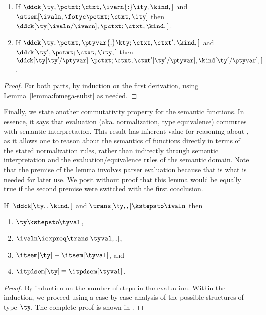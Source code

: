 \begin{lemma}
  \begin{enumerate}
  \item If $\ddck[\ty,{\pctxt;\ctxt,\ivarn{:}\ity},\kind,]$ and 
    $\stsem[\ivaln,{\fotyc \pctxt;\ctxt},\ity]$
    then $\ddck[\ty[\ivaln/\ivarn],\pctxt;\ctxt,\kind,]$.
  \item If $\ddck[\ty,{\pctxt,\ptyvar{:}\kty;\ctxt,\ctxt'},\kind,]$ and 
    $\ddck[\ty',\pctxt;\ctxt,\kty,]$
    then $\ddck[\ty[\ty'/\ptyvar],{\pctxt;\ctxt,\ctxt'[\ty'/\ptyvar]},{\kind[\ty'/\ptyvar]},]$.
  \end{enumerate}
  \label{lemma:ty-val-subst} %
  \label{lemma:ty-ty-subst}  %
  \label{lemma:ddc-subst}
\end{lemma}
\begin{proof}
  For both parts, by induction on the first derivation, using
  Lemma~\ref{lemma:fomega-subst} as needed.
\end{proof}


Finally, we state another commutativity property for the semantic
functions. In essence, it says that evaluation (aka. normalization,
type equivalence) commutes with semantic interpretation. This result
has inherent value for reasoning about \ddc{}, as it allows one to
reason about the semantics of \ddc{} functions directly in terms of
the stated normalization rules, rather than indirectly through
semantic interpretation and the evaluation/equivalence rules of the
semantic domain. Note that the premise of the lemma involves parser
evaluation because that is what is needed for later use. We posit without
proof that this lemma would be equally true if the second
premise were switched with the first conclusion.

\begin{lemma}
  If $\; \ddck[\ty,,\kind,]$ and $\trans[\ty,,] \kstepsto \ivaln$ then
  \begin{enumerate}
  \item $\ty \kstepsto \tyval$,
  \item $\ivaln \iexpreq \trans[\tyval,,]$,
  \item $\itsem[\ty] \equiv \itsem[\tyval]$, and
  \item $\itpdsem[\ty] \equiv \itpdsem[\tyval]$.
  \end{enumerate}
\label{lemma:eval-corr}
\end{lemma}
\begin{proof}
  By induction on the number of steps in the evaluation.  Within the
  induction, we proceed using a case-by-case analysis of the possible
  structures of type $\ty$. The complete proof is shown in
  .
\end{proof}



